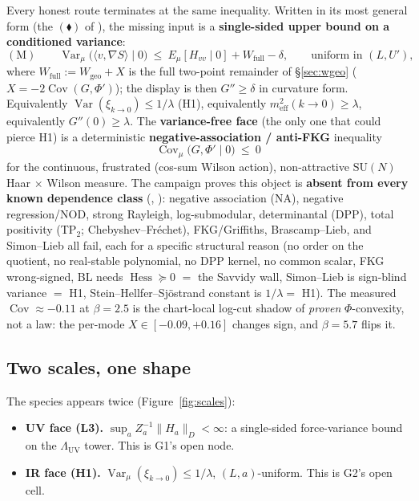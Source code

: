 Every honest route terminates at the same inequality. Written in its most general form (the
$(\blacklozenge)$ of ), the missing input is a \textbf{single-sided
upper bound on a conditioned variance}:
\begin{equation}
(\mathrm{M})\qquad
\operatorname{Var}_\mu\bigl(\langle v,\nabla S\rangle\mid0\bigr)
\ \le\ E_\mu[H_{vv}\mid0]+W_{\mathrm{full}}-\delta ,
\qquad\text{uniform in }(L,U'),
\label{eq:species}
\end{equation}
where $W_{\mathrm{full}}:=W_{\mathrm{geo}}+X$ is the full two-point remainder of
\S\ref{sec:wgeo} ($X=-2\operatorname{Cov}(G,\Phi')$); the display is then $G''\ge\delta$ in
curvature form. Equivalently $\operatorname{Var}(\xi_{k\to0})\le1/\lambda$ (H1), equivalently
$m_{\mathrm{eff}}^2(k\to0)\ge\lambda$, equivalently $G''(0)\ge\lambda$. The
\textbf{variance-free face} (the only one that could pierce H1) is a deterministic
\textbf{negative-association / anti-FKG} inequality
\begin{equation}
\operatorname{Cov}_\mu\bigl(G,\Phi'\mid0\bigr)\ \le\ 0
\label{eq:neqassoc}
\end{equation}
for the continuous, frustrated (cos-sum Wilson action), non-attractive $\mathrm{SU}(N)$
Haar $\times$ Wilson measure. The campaign proves this object is \textbf{absent from every known
dependence class} (, ): negative association
(NA), negative regression/NOD, strong Rayleigh, log-submodular, determinantal (DPP), total
positivity (TP$_2$; Chebyshev--Fréchet), FKG/Griffiths, Brascamp--Lieb, and Simon--Lieb all fail,
each for a specific structural reason (no order on the quotient, no real-stable polynomial, no
DPP kernel, no common scalar, FKG wrong-signed, BL needs $\operatorname{Hess}\succeq0$ $=$ the
Savvidy wall, Simon--Lieb is sign-blind variance $=$ H1, Stein--Hellfer--Sjöstrand constant is
$1/\lambda=$ H1). The measured $\operatorname{Cov}\approx-0.11$ at $\beta=2.5$ is the
chart-local log-cut shadow of \emph{proven} $\Phi$-convexity, not a law: the per-mode
$X\in[-0.09,+0.16]$ changes sign, and $\beta=5.7$ flips it.

\subsection{Two scales, one shape}

The species appears twice (Figure~\ref{fig:scales}):

\begin{itemize}
\item \textbf{UV face (L3).} $\sup_aZ_a^{-1}\|H_a\|_D<\infty$: a single-sided force-variance
  bound on the $\Lambda_{\mathrm{UV}}$ tower. This is G1's open node.
\item \textbf{IR face (H1).} $\operatorname{Var}_\mu(\xi_{k\to0})\le1/\lambda$, $(L,a)$-uniform.
  This is G2's open cell.
\end{itemize}

